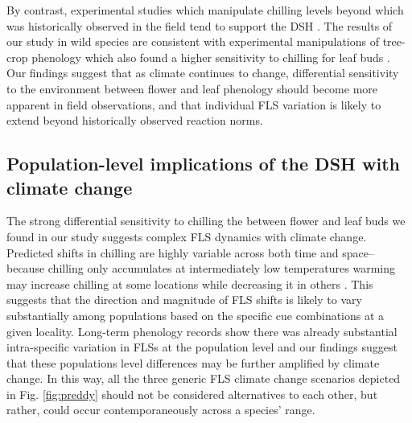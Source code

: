 \documentclass[11pt]{article}
\begin{document}
\noindent By contrast, experimental studies which manipulate chilling levels beyond which was historically observed in the field tend to support the DSH \citep[e.g.][]{Aslani2009,Gariglio2006}. The results of our study in wild species are consistent with experimental manipulations of tree-crop phenology which also found a higher sensitivity to chilling for leaf buds \citep{Gariglio2006,Citadin2001}. Our findings suggest that as climate continues to change, differential sensitivity to the environment between flower and leaf phenology should become more apparent in field observations, and that individual FLS variation is likely to extend beyond historically observed reaction norms. %

\subsection*{Population-level implications of the DSH with climate change} %
\noindent The strong differential sensitivity to chilling the between flower and leaf buds we found in our study suggests complex FLS dynamics with climate change. Predicted shifts in chilling are highly variable across both time and space-- because chilling only accumulates at intermediately low temperatures warming may increase chilling at some locations while decreasing it in others \citep{Ettinger2020}. This suggests that the direction and magnitude of FLS shifts is likely to vary substantially among populations based on the specific cue combinations at a given locality. Long-term phenology records show there was already substantial intra-specific variation in FLSs at the population level \citep{Buonaiuto2020} and our findings suggest that these populations level differences may be further amplified by climate change. In this way, all the three generic FLS climate change scenarios depicted in Fig. \ref{fig:preddy} should not be considered alternatives to each other, but rather, could occur contemporaneously across a species' range. \\ %
\end{document}
